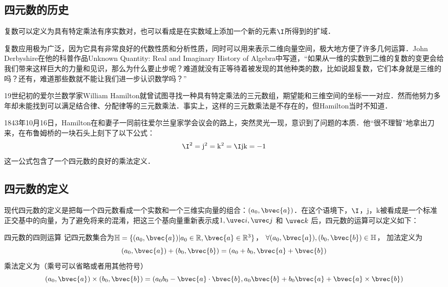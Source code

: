 
\subsection{四元数的历史}

复数可以定义为具有特定乘法有序实数对，也可以看成是在实数域上添加一个新的元素$  \I$所得到的扩域．

复数应用极为广泛，因为它具有非常良好的代数性质和分析性质，同时可以用来表示二维向量空间，极大地方便了许多几何运算．John Derbyshire在他的科普作品Unknown Quantity: Real and Imaginary History of Algebra中写道，“如果从一维的实数到二维的复数的变更会给我们带来这样巨大的力量和见识，那么为什么要止步呢？难道就没有正等待着被发现的其他种类的数，比如说超复数，它们本身就是三维的吗？还有，难道那些数就不能让我们进一步认识数学吗？”

19世纪初的爱尔兰数学家William Hamilton就曾试图寻找一种具有特定乘法的三元数组，期望能和三维空间的坐标一一对应．然而他努力多年却未能找到可以满足结合律、分配律等的三元数乘法．事实上，这样的三元数乘法是不存在的，但Hamilton当时不知道．

1843年10月16日，Hamilton在和妻子一同前往爱尔兰皇家学会议会的路上，突然灵光一现，意识到了问题的本质．他“很不理智”地拿出刀来，在布鲁姆桥的一块石头上刻下了以下公式：
\begin{equation}
\I^2=\mathrm{j}^2=\mathrm{k}^2=\I\mathrm{j}\mathrm{k}=-1
\end{equation}
这一公式包含了一个四元数的良好的乘法定义．

\subsection{四元数的定义}

现代四元数的定义是把每一个四元数看成一个实数和一个三维实向量的组合：$(a_0, \bvec{a})$．在这个语境下，$\I$，$\mathrm{j}$，$\mathrm{k}$被看成是一个标准正交基中的向量，为了避免将来的混淆，把这三个基向量重新表示成$1, \uvec i, \uvec j$ 和 $\uvec k$ 后，四元数的运算可以定义如下：

\begin{definition}{四元数的四则运算}
记四元数集合为$\mathbb{H}=\{(a_0, \bvec{a})|a_0\in\mathbb{R}, \bvec{a}\in\mathbb{R}^3\}$， $\forall(a_0, \bvec{a}), (b_0, \bvec{b})\in\mathbb{H}$， 加法定义为
\begin{equation}
(a_0, \bvec{a})+ (b_0, \bvec{b})=(a_0+b_0, \bvec{a}+\bvec{b})
\end{equation}
乘法定义为（乘号可以省略或者用其他符号）
\begin{equation}\label{Quat_eq1}
(a_0, \bvec{a})\times (b_0, \bvec{b})=(a_0b_0-\bvec{a}\cdot\bvec{b}, a_0\bvec{b}+b_0\bvec{a}+\bvec{a}\times\bvec{b})
\end{equation}
\end{definition}

